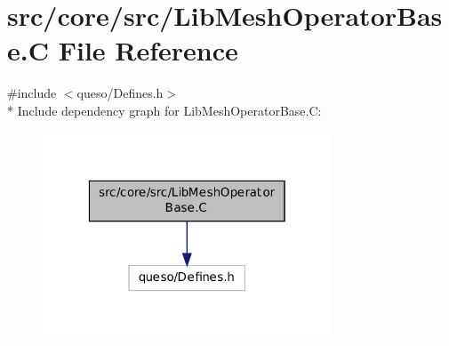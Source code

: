 \hypertarget{_lib_mesh_operator_base_8_c}{\section{src/core/src/\-Lib\-Mesh\-Operator\-Base.C File Reference}
\label{_lib_mesh_operator_base_8_c}
}
{\ttfamily \#include $<$queso/\-Defines.\-h$>$}\\*
Include dependency graph for Lib\-Mesh\-Operator\-Base.\-C\-:
\nopagebreak
\begin{figure}[H]
\begin{center}
\leavevmode
\includegraphics[width=244pt]{_lib_mesh_operator_base_8_c__incl}
\end{center}
\end{figure}
